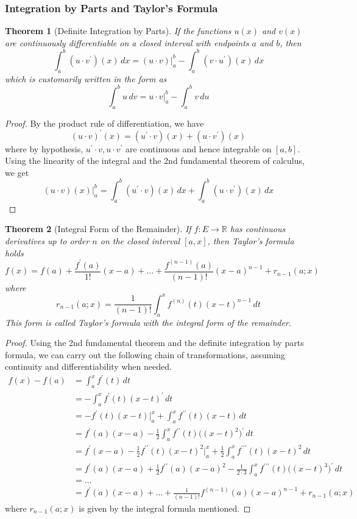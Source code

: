 \documentclass{article}
\newtheorem{theorem}{Theorem}[section]
\theoremstyle{remark}
\theoremstyle{definition}
\begin{document}
\subsubsection{Integration by Parts and Taylor's Formula}
\begin{theorem}[Definite Integration by Parts]
If the functions $u(x)$ and $v(x)$ are continuously differentiable on a closed interval with endpoints $a$ and $b$, then
\[\int_a^b (u \cdot v^\prime)(x)\,dx = (u \cdot v)\big|^b_a - \int_a^b (v \cdot u^\prime)(x)\,dx\]
which is customarily written in the form as
\[\int_a^b u\,dv = u \cdot v \big|_a^b - \int_a^b v\,du\]
\end{theorem}
\begin{proof}
By the product rule of differentiation, we have
\[(u \cdot v)^\prime (x) = (u^\prime \cdot v)(x) + (u \cdot v^\prime) (x)\]
where by hypothesis, $u^\prime \cdot v, u \cdot v^\prime$ are continuous and hence integrable on $[a, b]$. Using the linearity of the integral and the 2nd fundamental theorem of calculus, we get
\[(u \cdot v) (x) \big|^b_a = \int_a^b (u^\prime \cdot v)(x)\,dx + \int_a^b (u \cdot v^\prime) (x)\,dx\]
\end{proof}

\begin{theorem}[Integral Form of the Remainder]
If $f: E \longrightarrow \mathbb{R}$ has continuous derivatives up to order $n$ on the closed interval $[a, x]$, then Taylor's formula holds
\[f(x) = f(a) + \frac{f^\prime (a)}{1!} (x - a) + \ldots + \frac{f^{(n-1)}(a)}{(n-1)!} (x - a)^{n-1} + r_{n-1}(a; x)\]
where 
\[r_{n-1} (a;x) = \frac{1}{(n-1)!} \int_a^x f^{(n)} (t) (x - t)^{n-1} \,dt\]
This form is called \textit{Taylor's formula with the integral form of the remainder}. 
\end{theorem}
\begin{proof}
Using the 2nd fundamental theorem and the definite integration by parts formula, we can carry out the following chain of transformations, assuming continuity and differentiability when needed. 
\begin{align*}
    f(x) - f(a) & = \int_a^x f^\prime (t) \,dt \\
    & = - \int_a^x f^\prime(t) (x - t)^\prime \,dt \\
    & = -f^\prime (t) (x - t)\big|_a^x + \int_a^x f^{\prime\prime} (t) (x - t) \,dt \\
    & = f^\prime (a) (x - a) - \frac{1}{2} \int_a^x f^{\prime\prime} (t) \big( (x - t)^2\big)^\prime \,dt \\
    & = f^\prime (x - a) - \frac{1}{2} f^{\prime\prime} (t) (x - t)^2 \big|_a^x + \frac{1}{2} \int_a^x f^{\prime\prime\prime} (t) (x - t)^2\,dt \\
    & = f^\prime(a) (x - a) + \frac{1}{2} f^{\prime\prime} (a) (x - a)^2 - \frac{1}{2 \cdot 3} \int_a^x f^{\prime\prime\prime} (t) \big((x - t)^3\big)^\prime\,dt \\
    & = \ldots \\
    & = f^\prime (a) (x - a) + \ldots + \frac{1}{(n-1)!} f^{(n-1)} (a)(x - a)^{n-1} + r_{n-1}(a;x)
\end{align*}
where $r_{n-1}(a;x)$ is given by the integral formula mentioned. 
\end{proof}
\end{document}
